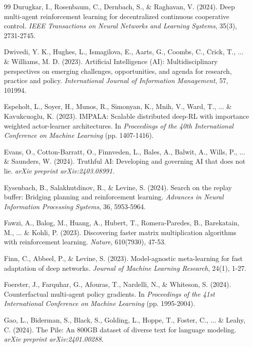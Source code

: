 \begin{thebibliography}{99}
Durugkar, I., Rosenbaum, C., Dernbach, S., \& Raghavan, V. (2024). Deep multi-agent reinforcement learning for decentralized continuous cooperative control. \textit{IEEE Transactions on Neural Networks and Learning Systems}, 35(3), 2731-2745.

Dwivedi, Y. K., Hughes, L., Ismagilova, E., Aarts, G., Coombs, C., Crick, T., ... \& Williams, M. D. (2023). Artificial Intelligence (AI): Multidisciplinary perspectives on emerging challenges, opportunities, and agenda for research, practice and policy. \textit{International Journal of Information Management}, 57, 101994.

Espeholt, L., Soyer, H., Munos, R., Simonyan, K., Mnih, V., Ward, T., ... \& Kavukcuoglu, K. (2023). IMPALA: Scalable distributed deep-RL with importance weighted actor-learner architectures. In \textit{Proceedings of the 40th International Conference on Machine Learning} (pp. 1407-1416).

Evans, O., Cotton-Barratt, O., Finnveden, L., Bales, A., Balwit, A., Wills, P., ... \& Saunders, W. (2024). Truthful AI: Developing and governing AI that does not lie. \textit{arXiv preprint arXiv:2403.08991}.

Eysenbach, B., Salakhutdinov, R., \& Levine, S. (2024). Search on the replay buffer: Bridging planning and reinforcement learning. \textit{Advances in Neural Information Processing Systems}, 36, 5953-5964.

Fawzi, A., Balog, M., Huang, A., Hubert, T., Romera-Paredes, B., Barekatain, M., ... \& Kohli, P. (2023). Discovering faster matrix multiplication algorithms with reinforcement learning. \textit{Nature}, 610(7930), 47-53.

Finn, C., Abbeel, P., \& Levine, S. (2023). Model-agnostic meta-learning for fast adaptation of deep networks. \textit{Journal of Machine Learning Research}, 24(1), 1-27.

Foerster, J., Farquhar, G., Afouras, T., Nardelli, N., \& Whiteson, S. (2024). Counterfactual multi-agent policy gradients. In \textit{Proceedings of the 41st International Conference on Machine Learning} (pp. 1995-2004).

Gao, L., Biderman, S., Black, S., Golding, L., Hoppe, T., Foster, C., ... \& Leahy, C. (2024). The Pile: An 800GB dataset of diverse text for language modeling. \textit{arXiv preprint arXiv:2401.00288}.


\end{thebibliography}
